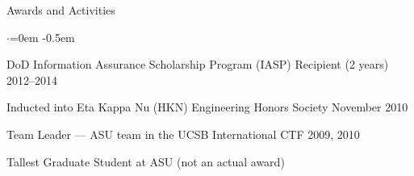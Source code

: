 \documentclass{resume} %
\begin{document}

\begin{rSection}{Awards and Activities}

\begin{list}{$\cdot$}{\leftmargin=0em} %
   \itemsep -0.5em
	
	\item DoD Information Assurance Scholarship Program (IASP) Recipient (2 years) \hfill 2012--2014

	\item Inducted into Eta Kappa Nu (HKN) Engineering Honors Society \hfill November 2010
	
	\item Team Leader --- ASU team in the UCSB International CTF \hfill 2009, 2010
	
	\item Tallest Graduate Student at ASU \hfill (not an actual award)

\end{list}

\end{rSection}





\end{document}
